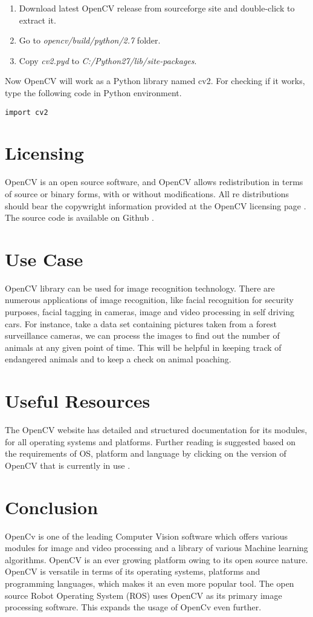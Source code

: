 \documentclass[9pt,twocolumn,twoside]{../../styles/osajnl}
\begin{document}
\begin{enumerate}
    \item Download latest OpenCV release from sourceforge site \cite{www-opencv-sf} and double-click to extract it.
    \item Go to \textit{opencv/build/python/2.7} folder.
    \item Copy \textit{cv2.pyd} to \textit{C:/Python27/lib/site-packages}. 
\end{enumerate}
Now OpenCV will work as a Python library named cv2. For checking if it works, type the following code in Python environment.
\begin{Verbatim}
import cv2
\end{Verbatim}
 

\section{Licensing}
OpenCV is an open source software, and OpenCV allows redistribution in terms of source or binary forms, with or without modifications. All re distributions should bear the copywright information provided at the OpenCV licensing page \cite{www-opencv-license}. The source code is available on Github \cite{www-git-opencv}.

\section{Use Case}
OpenCV library can be used for image recognition technology. There are numerous applications of image recognition, like facial recognition for security purposes, facial tagging in cameras, image and video processing in self driving cars. For instance, take a data set containing pictures taken from a forest surveillance cameras, we can process the images to find out the number of animals at any given point of time. This will be helpful in keeping track of endangered animals and to keep a check on animal poaching. 

\section{Useful Resources}
The OpenCV website has detailed and structured documentation for its modules, for all operating systems and platforms. Further reading is suggested based on the requirements of OS, platform and language by clicking on the version of OpenCV that is currently in use \cite{www-opencv-docs}. 
\section{Conclusion}
OpenCv is one of the leading Computer Vision software which offers various modules for image and video processing and a library of various Machine learning algorithms. OpenCV is an ever growing platform owing to its open source nature. OpenCV is versatile in terms of its operating systems, platforms and programming languages, which makes it an even more popular tool. The open source Robot Operating System (ROS) uses OpenCV as its primary image processing software. This expands the usage of OpenCv even further. 
\end{document}
